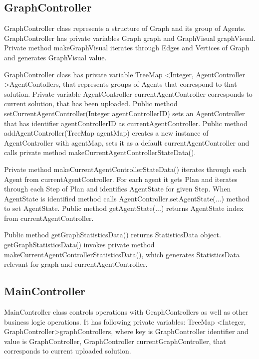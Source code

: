 \documentclass[thesis=B,english]{FITthesis}[2019/12/23]
\begin{document}
\subsection{GraphController}

GraphController class represents a structure of Graph and its group of Agents. GraphController has private variables Graph graph and GraphVisual graphVisual. Private method makeGraphVisual iterates through Edges and Vertices of Graph and generates GraphVisual value.  

GraphController class has private variable TreeMap \textless Integer, AgentController \textgreater AgentContollers, that represents groups of Agents that correspond to that solution. Private variable AgentController currentAgentController corresponds to current solution, that has been uploaded. Public method setCurrentAgentController(Integer agentControllerID) sets an AgentController that has identifier agentControllerID as currentAgentController. Public method addAgentController(TreeMap agentMap) creates a new instance of AgentController with agentMap, sets it as a default currentAgentController and calls private method makeCurrentAgentControllerStateData().

Private method makeCurrentAgentControllerStateData() iterates through each Agent from currentAgentController. For each agent it gets Plan and iterates through each Step of Plan and identifies AgentState for given Step. When AgentState is identified method calls AgentController.setAgentState(...) method to set AgentState. Public method getAgentState(...) returns AgentState index from currentAgentController. 

Public method getGraphStatisticsData()  returns StatisticsData object. getGraphStatisticsData() invokes private method makeCurrentAgentControllerStatisticsData(), which generates StatisticsData relevant for graph and currentAgentController.

\subsection{MainController}

MainController class controls operations with GraphControllers as well as other business logic operations. It has following private variables: TreeMap \textless Integer, GraphController\textgreater graphControllers, where key is GraphController identifier and value is GraphController,  GraphController currentGraphController, that corresponds to current uploaded solution.
\end{document}
